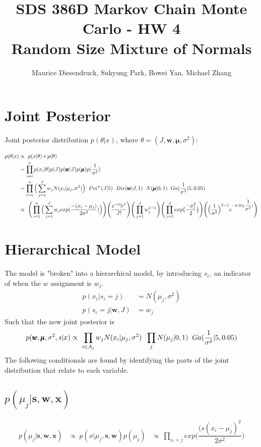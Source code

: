 \documentclass[11pt,letterpaper]{article}
\author{Maurice Diesendruck, Sukyung Park, Bowei Yan, Michael Zhang}
\title{SDS 386D Markov Chain Monte Carlo - HW 4 \\ Random Size Mixture of Normals}
\begin{document}
\maketitle


\section{Joint Posterior}
Joint posterior distribution $p(\theta|x)$, where $\theta=(J,\pmb{w},\pmb{\mu},\sigma^2)$:

\begin{align*}
p(\theta|x) &\propto\ p(x|\theta)*p(\theta) \\
	&= \prod_{i=i}^n p(x_i|\theta) p(J) p(\pmb{w}|J) p(\pmb{\mu}) p(\frac{1}
		{\sigma^2})\\
	&= \prod_{i=1}^n \Big( \sum_{j=1}^J w_j N(x_i|\mu_j,\sigma^2) \Big) 
		\hspace{2mm} Poi^+(J|5) \hspace{2mm} Dir(\pmb{w}|J,1) \hspace{2mm}
		N(\pmb{\mu}|0,1) \hspace{2mm} Ga(\frac{1}{\sigma^2}|5,0.05)\\
	&\propto\ \Bigg( \prod_{i=1}^n \Big( \sum_{j=1}^J w_j exp(\frac{-(x_i-\mu_j)}
		{2\sigma^2}) \Big) \Bigg) 
		\Bigg( \frac{e^{-5}5^J}{J!} \Bigg) 
		\Bigg( \prod_{j=1}^J w_j^{1-1} \Bigg) 
		\Bigg( \prod_{j=1}^J exp\lbrace \frac{-\mu_j^2}{2} \rbrace \Bigg)
		\Bigg( \Big( \dfrac{1}{\sigma^2} \Big)^{5-1}
			e^{-0.05(\dfrac{1}{\sigma^2})} \Bigg)
\end{align*}

\section{Hierarchical Model}

The model is "broken" into a hierarchical model, by introducing $s_i$, an
	indicator of when the $w$ assignment is $w_j$.
\begin{align*}
p(x_i|s_i=j) &= N(\mu_j,\sigma^2)\\
p(s_i=j|\pmb{w},J) &= w_j
\end{align*}
Such that the new joint posterior is
\begin{align*}
p(\pmb{w},\pmb{\mu},\sigma^2,s|x) \propto\ 
	\prod_{i\in{A_j}} w_j N(x_i|\mu_j,\sigma^2) 
	\hspace{2mm} \prod_{j} N(\mu_j|0,1) \hspace{2mm} Ga(\frac{1}{\sigma^2}|5,0.05)\\
\end{align*}
The following conditionals are found by identifying the parts of the joint
	distribution that relate to each variable.

\subsection{$p(\mu_j|\pmb{s},\pmb{w},\pmb{x})$}
\begin{align*}
p(\mu_j|\pmb{s},\pmb{w},\pmb{x}) &\propto\ p(x|\mu_j,\pmb{s},\pmb{w})p(\mu_j)
&\propto\ \prod_{s_i=j} exp \Big( \dfrac{(s(x_i-\mu_j)^2}{2\sigma^2} \Big)
\end{align*}



\newpage
\vspace{40mm}
\end{document}
